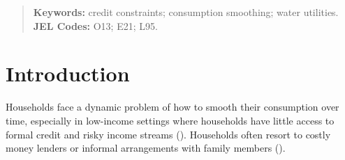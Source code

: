 \documentclass[12pt,table]{article}
\begin{document}
\begin{titlepage}
\begin{abstract}











\vspace{1in}
\textbf{Keywords:} credit constraints; consumption smoothing; water utilities. \\
\textbf{JEL Codes:} O13; E21; L95. \\
\bigskip
\end{abstract}
\setcounter{page}{0}
\thispagestyle{empty}
\end{titlepage}
\pagebreak \newpage

\onehalfspacing

\section{Introduction}

Households face a dynamic problem of how to smooth their consumption over time, especially in low-income settings where households have little access to formal credit and risky income streams (\cite{morduch1995income}).  Households often resort to costly money lenders or informal arrangements with family members (\cite{banerjee2007economic}).  
\end{document}
